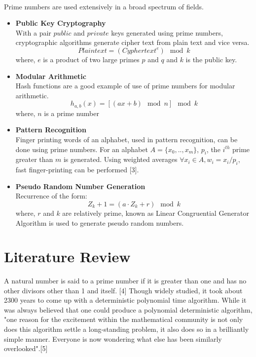 \documentclass[paper=a4, fontsize=11pt]{scrartcl}	%
\numberwithin{equation}{section}		%
\numberwithin{figure}{section}		%
\numberwithin{table}{section}		%
\begin{document}
\paragraph{} Prime numbers are used extensively in a broad spectrum of fields. 
\begin{itemize}
\item \textbf{Public Key Cryptography\\}
With a pair $public$ and $private$ keys generated using prime numbers, cryptographic algorithms generate cipher text from plain text and vice versa.
\[Plain text = (Cypher text^e) \mod k\]
where, $e$ is a product of two large primes $p$ and  $q$ and $k$ is the public key.
\item \textbf{Modular Arithmetic}\\
Hash functions are a good example of use of prime numbers for modular arithmetic. 
\[h_{a,b}(x)=[(ax+b) \mod n] \mod k \]
where, $n$ is a prime number
\item \textbf{Pattern Recognition}\\
Finger printing words of an alphabet, used in pattern recognition,  can be done using prime numbers. For an alphabet $A = \{x_0, .., x_m\}$, $p_i$, the $i^{th}$ prime greater than $m$ is generated. Using weighted averages $\forall x_i \in A, w_i = x_i/p_i$, fast finger-printing can be performed [3].
\item \textbf{Pseudo Random Number Generation}\\
Recurrence of the form:
\[Z_k+1 = (a \cdot Z_k + r) \mod k \]
where, $r$ and $k$ are relatively prime, known as Linear Congruential Generator Algorithm is used to generate pseudo random numbers. 
\end{itemize}

\section{Literature Review}
\paragraph{}A natural number is said to a prime number if it is greater than one and has no other divisors other than 1 and itself. [4] Though widely studied, it took about 2300 years to come up with a deterministic polynomial time algorithm. While it was always believed that one could produce a polynomial deterministic algorithm, "one reason for the excitement within the mathematical community is not only does this algorithm settle a long-standing problem, it also does so in a brilliantly simple manner. Everyone is now wondering what else has been similarly overlooked".[5]
\end{document}
